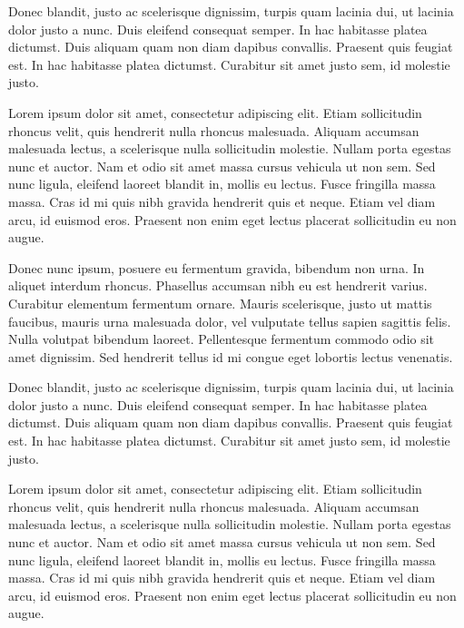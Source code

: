 \documentclass[12pt,lot,lof]{quthesis}
\begin{document}
Donec blandit, justo ac scelerisque dignissim, turpis quam lacinia dui, ut lacinia dolor justo a nunc. Duis eleifend consequat semper. In hac habitasse platea dictumst. Duis aliquam quam non diam dapibus convallis. Praesent quis feugiat est. In hac habitasse platea dictumst. Curabitur sit amet justo sem, id molestie justo.

Lorem ipsum dolor sit amet, consectetur adipiscing elit. Etiam sollicitudin rhoncus velit, quis hendrerit nulla rhoncus malesuada. Aliquam accumsan malesuada lectus, a scelerisque nulla sollicitudin molestie. Nullam porta egestas nunc et auctor. Nam et odio sit amet massa cursus vehicula ut non sem. Sed nunc ligula, eleifend laoreet blandit in, mollis eu lectus. Fusce fringilla massa massa. Cras id mi quis nibh gravida hendrerit quis et neque. Etiam vel diam arcu, id euismod eros. Praesent non enim eget lectus placerat sollicitudin eu non augue.

Donec nunc ipsum, posuere eu fermentum gravida, bibendum non urna. In aliquet interdum rhoncus. Phasellus accumsan nibh eu est hendrerit varius. Curabitur elementum fermentum ornare. Mauris scelerisque, justo ut mattis faucibus, mauris urna malesuada dolor, vel vulputate tellus sapien sagittis felis. Nulla volutpat bibendum laoreet. Pellentesque fermentum commodo odio sit amet dignissim. Sed hendrerit tellus id mi congue eget lobortis lectus venenatis.

Donec blandit, justo ac scelerisque dignissim, turpis quam lacinia dui, ut lacinia dolor justo a nunc. Duis eleifend consequat semper. In hac habitasse platea dictumst. Duis aliquam quam non diam dapibus convallis. Praesent quis feugiat est. In hac habitasse platea dictumst. Curabitur sit amet justo sem, id molestie justo.

Lorem ipsum dolor sit amet, consectetur adipiscing elit. Etiam sollicitudin rhoncus velit, quis hendrerit nulla rhoncus malesuada. Aliquam accumsan malesuada lectus, a scelerisque nulla sollicitudin molestie. Nullam porta egestas nunc et auctor. Nam et odio sit amet massa cursus vehicula ut non sem. Sed nunc ligula, eleifend laoreet blandit in, mollis eu lectus. Fusce fringilla massa massa. Cras id mi quis nibh gravida hendrerit quis et neque. Etiam vel diam arcu, id euismod eros. Praesent non enim eget lectus placerat sollicitudin eu non augue.

{
\singlespacing


\cleardoublepage
\ifdefined{}
\else
\fi
{}


}
\end{document}
